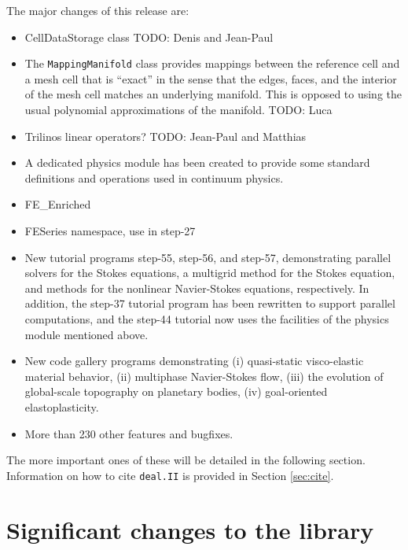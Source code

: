 \documentclass{ansarticle-preprint}
\newcommand{\specialword}[1]{\texttt{#1}}
\newcommand{\dealii}{{\specialword{deal.II}}}
\begin{document}
The major changes of this release are:
\begin{itemize}
\item CellDataStorage class
  TODO: Denis and Jean-Paul

\item The \texttt{MappingManifold} class provides mappings between the
  reference cell and a mesh cell that is ``exact'' in the sense that
  the edges, faces, and the interior of the mesh cell matches an
  underlying manifold. This is opposed to using the usual polynomial
  approximations of the manifold.
  TODO: Luca

\item Trilinos linear operators?
  TODO: Jean-Paul and Matthias

\item A dedicated physics module has been created to provide some standard definitions and operations used in continuum physics.

\item FE\_Enriched

\item FESeries namespace, use in step-27

\item New tutorial programs step-55, step-56, and step-57,
  demonstrating parallel solvers for the Stokes equations, a multigrid
  method for the Stokes equation, and methods for the nonlinear
  Navier-Stokes equations, respectively. In addition, the step-37
  tutorial program has been rewritten to support parallel
  computations, and the step-44 tutorial now uses the facilities of
  the physics module mentioned above.

\item New code gallery programs demonstrating (i) quasi-static
  visco-elastic material behavior, (ii) multiphase Navier-Stokes flow,
  (iii) the evolution of global-scale topography on planetary bodies,
  (iv) goal-oriented elastoplasticity.


\item More than 230 other features and bugfixes.
\end{itemize}
The more important ones of these will be detailed in the following section.
Information on how to cite \dealii{} is provided in Section \ref{sec:cite}.


\section{Significant changes to the library}
\end{document}
